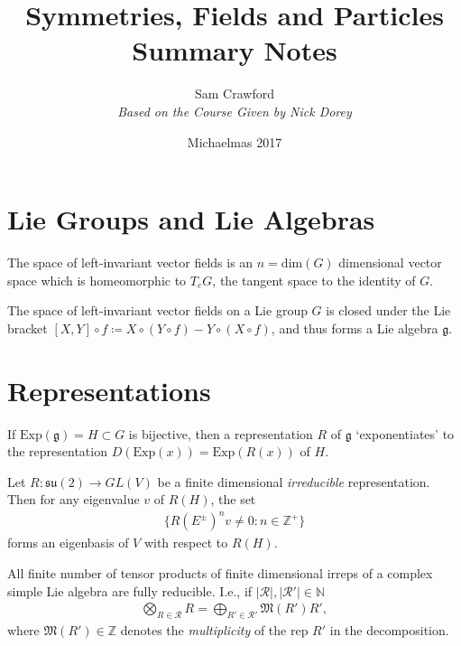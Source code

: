 \documentclass[11pt,fleqn,final]{article}
\begin{document}
\title{Symmetries, Fields and Particles\\
\Large{Summary Notes} \\ \hrulefill}
\author{Sam Crawford\\
\large{\textsl{Based on the Course Given by Nick Dorey}}}
\date{Michaelmas 2017}

\maketitle

\section{Lie Groups and Lie Algebras}

\begin{prop}
The space of left-invariant vector fields is an $n=\text{dim}(G)$ dimensional vector space which is homeomorphic to $T_eG$, the tangent space to the identity of $G$.
\end{prop}

\begin{prop}
The space of left-invariant vector fields on a Lie group $G$ is closed under the Lie bracket $[X,Y]\circ f \coloneqq X\circ(Y\circ f) - Y \circ (X \circ f)$, and thus forms a Lie algebra $\mathfrak{g}$.
\end{prop}

\section{Representations}

\begin{prop}
If $\text{Exp}(\mathfrak{g}) = H \subset G$ is bijective, then a representation $R$ of $\mathfrak{g}$ `exponentiates' to the representation $D(\text{Exp}(x)) = \text{Exp}(R(x))$ of $H$.
\end{prop}

\begin{prop}
Let $R : \mathfrak{su}(2) \to GL(V)$ be a finite dimensional \textit{irreducible} representation. Then for any eigenvalue $v$ of $R(H)$, the set
\begin{align*}
\{ R(E^\pm)^nv \neq 0 : n \in \mathbb{Z}^+ \}
\end{align*}
forms an eigenbasis of $V$ with respect to $R(H)$.
\end{prop}

\begin{prop}
All finite number of tensor products of finite dimensional irreps of a complex simple Lie algebra are fully reducible. I.e., if $|\mathcal{R}|, |\mathcal{R}'| \in \mathbb{N}$
\begin{align}\label{RepDecompositions}
\bigotimes_{R \in \mathcal{R}} R = \bigoplus_{R' \in \mathcal{R}'} \mathfrak{M}(R') R',
\end{align}
where $\mathfrak{M}(R') \in \mathbb{Z}$ denotes the \textit{multiplicity} of the rep $R'$ in the decomposition.
\end{prop}
\end{document}
